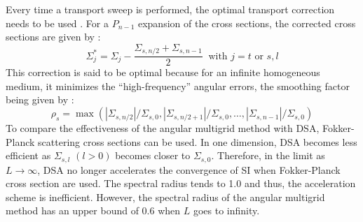 Every time a transport sweep is performed, the optimal transport correction
needs to be used \cite{multigrid_1d}. For a $P_{n-1}$ expansion of the cross
sections, the corrected cross sections are given by :
\begin{equation}
\Sigma_{j}^* = \Sigma_{j} -\frac{\Sigma_{s,n/2}+\Sigma_{s,n-1}}{2}\ 
\textrm{ with }j=t \textrm{ or }s,l
\end{equation}
This correction is said to be optimal because for an infinite homogeneous medium, 
it minimizes the ``high-frequency'' angular errors, the smoothing factor being 
given by :
\begin{equation}
\rho_s =
\max(|\Sigma_{s,n/2}|/\Sigma_{s,0},|\Sigma_{s,n/2+1}|/\Sigma_{s,0},\hdots,
|\Sigma_{s,n-1}|/\Sigma_{s,0})
\end{equation}
To compare the effectiveness of the angular multigrid method with DSA, 
Fokker-Planck scattering cross sections can be used. In one dimension,
DSA becomes less efficient as $\Sigma_{s,l}$ $(l>0)$ becomes closer to
$\Sigma_{s,0}$. Therefore, in the limit as $L\rightarrow \infty$, DSA no
longer accelerates the convergence of SI when Fokker-Planck cross section are used. 
The spectral radius tends to 1.0 and thus,
the acceleration scheme is inefficient. However, the spectral radius of the
angular multigrid method has an upper bound of 0.6 when $L$ goes to
infinity.
